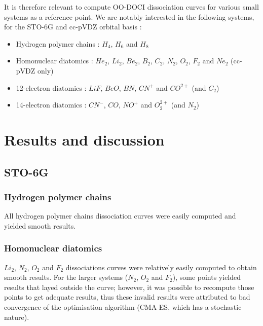 \documentclass[twoside,twocolumn,9pt]{article}
\begin{document}
It is therefore relevant to compute OO-DOCI dissociation curves for various small systems as a reference point. We are notably interested in the following systems, for the STO-6G and cc-pVDZ orbital basis :

\begin{itemize}
    \item Hydrogen polymer chains : $H_4$, $H_6$ and $H_8$ 
    \item Homonuclear diatomics : $He_2$, $Li_2$, $Be_2$, $B_2$, $C_2$, $N_2$, $O_2$, $F_2$ and $Ne_2$ (cc-pVDZ only)
    \item 12-electron diatomics : 
    $LiF$, $BeO$, $BN$, $CN^+$ and $CO^{2+}$ (and $C_2$)
    \item 14-electron diatomics : 
    $CN^-$, $CO$, $NO^+$ and $O_2^{2+}$ (and $N_2$)
\end{itemize}


\section{Results and discussion}
\subsection{STO-6G}
\subsubsection{Hydrogen polymer chains}
All hydrogen polymer chains dissociation curves were easily computed and yielded smooth results. 


\subsubsection{Homonuclear diatomics}
$Li_2$, $N_2$, $O_2$ and $F_2$ dissociations curves were relatively easily computed to obtain smooth results. For the larger systems ($N_2$, $O_2$ and $F_2$), some points yielded results that layed outside the curve; however, it was possible to recompute those points to get adequate results, thus these invalid results were attributed to bad convergence of the optimisation algorithm (CMA-ES, which has a stochastic nature).

\end{document}
